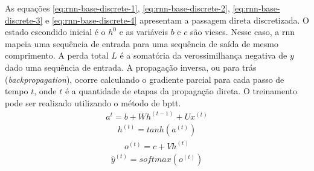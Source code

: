 As equações \ref{eq:rnn-base-discrete-1}, \ref{eq:rnn-base-discrete-2}, \ref{eq:rnn-base-discrete-3} e \ref{eq:rnn-base-discrete-4} apresentam a passagem direta discretizada. O estado escondido inicial é o $h^{0}$ e as variáveis $b$ e $c$ são vieses. Nesse caso, a \gls{rnn} mapeia uma sequência de entrada para uma sequência de saída de mesmo comprimento. A perda total $L$ é a somatória da verossimilhança negativa de $y$ dado uma sequência de entrada. A propagação inversa, ou para trás (\textit{backpropagation}), ocorre calculando o gradiente parcial para cada passo de tempo $t$, onde $t$ é a quantidade de etapas da propagação direta. O treinamento pode ser realizado utilizando o método de \gls{bptt}.
\begin{equation}
\begin{split}
    \label{eq:rnn-base-discrete-1}
    a^{t} = b + Wh^{(t-1)} + Ux^{(t)}
\end{split}
\end{equation}
\begin{equation}
\begin{split}
    \label{eq:rnn-base-discrete-2}
    h^{(t)} = tanh(a^{(t)})
\end{split}
\end{equation}
\begin{equation}
\begin{split}
    \label{eq:rnn-base-discrete-3}
    o^{(t)} = c + Vh^{(t)}
\end{split}
\end{equation}
\begin{equation}
\begin{split}
    \label{eq:rnn-base-discrete-4}
    \hat{y}^{(t)} = softmax(o^{(t)})
\end{split}
\end{equation}

\subsection{}
\label{sec:lstm}


